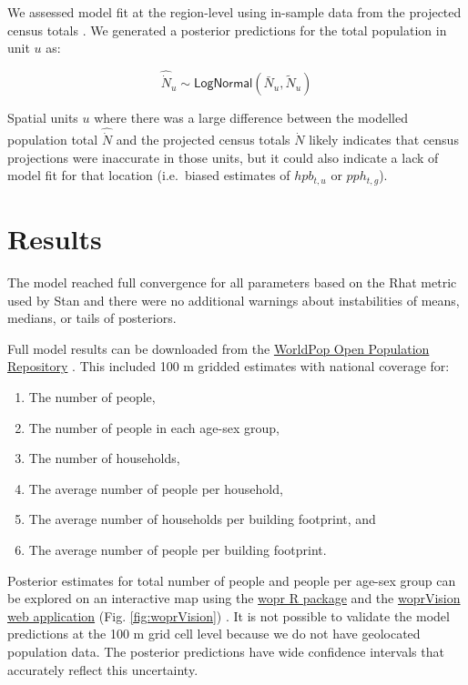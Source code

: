 \documentclass[]{book}
\providecommand{\tightlist}{%
  \setlength{\itemsep}{0pt}\setlength{\parskip}{0pt}}
\begin{document}
We assessed model fit at the region-level using in-sample data from the
projected census totals \citep{worldpop2018globala}. We generated a
posterior predictions for the total population in unit \(u\) as:

\begin{equation}
\hat{\dot{N}}_u \sim \textsf{LogNormal}(\bar{N}_u, \tilde{N}_u)
\end{equation}

Spatial units \(u\) where there was a large difference between the
modelled population total \(\hat{\dot{N}}\) and the projected census
totals \(\dot{N}\) likely indicates that census projections were
inaccurate in those units, but it could also indicate a lack of model
fit for that location (i.e.~biased estimates of \(hpb_{t,u}\) or
\(pph_{t,g}\)).

\section{Results}\label{results}

The model reached full convergence for all parameters based on the Rhat
metric used by Stan and there were no additional warnings about
instabilities of means, medians, or tails of posteriors.

Full model results can be downloaded from the
\href{https://wopr.worldpop.org/?GHA/Population/v1.0}{WorldPop Open
Population Repository} \citep{leasure2020bayesian}. This included 100 m
gridded estimates with national coverage for:

\begin{enumerate}
\def\labelenumi{\arabic{enumi}.}
\tightlist
\item
  The number of people,
\item
  The number of people in each age-sex group,
\item
  The number of households,
\item
  The average number of people per household,
\item
  The average number of households per building footprint, and
\item
  The average number of people per building footprint.
\end{enumerate}

Posterior estimates for total number of people and people per age-sex
group can be explored on an interactive map using the
\href{https://github.com/wpgp/wopr}{wopr R package} and the
\href{https://apps.worldpop.org/woprVision}{woprVision web application}
(Fig. \ref{fig:woprVision}) \citep{leasure2020wopr}. It is not possible
to validate the model predictions at the 100 m grid cell level because
we do not have geolocated population data. The posterior predictions
have wide confidence intervals that accurately reflect this uncertainty.
\end{document}
